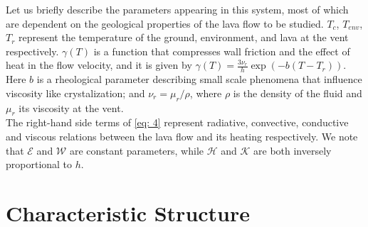 \documentclass[12pt]{article}
\begin{document}
Let us briefly describe the parameters appearing in this system, most of which are dependent on the geological properties of the lava flow to be studied. $T_c$, $T_{env}$, $T_{r}$ represent the temperature of the ground, environment, and lava at the vent respectively.
$\gamma(T)$ is a function that compresses wall friction and the effect of heat in the flow velocity, and it is given by $\gamma(T)=\frac{3\nu_r}{h}\exp(-b(T-T_r))$.
Here $b$ is a rheological parameter describing small scale phenomena that influence viscosity like crystalization; and $\nu_r=\mu_r/\rho$, where $\rho$ is the density of the fluid and $\mu_r$ its viscosity at the vent.\\

The right-hand side terms of \eqref{eq: 4} represent radiative, convective, conductive and viscous relations between the lava flow and its heating respectively.
We note that $\mathcal{E}$ and $\mathcal{W}$ are constant parameters, while $\mathcal{H}$ and $\mathcal{K}$ are both inversely proportional to $h$.








\section{Characteristic Structure}
\end{document}
